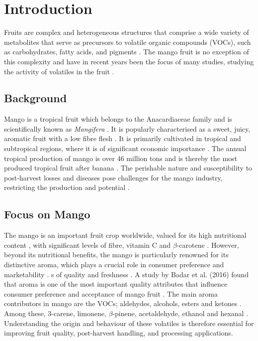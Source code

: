 \setcounter{chapter}{1}
\setcounter{section}{0}
\setlength{\headheight}{12.71342pt}
\addtolength{\topmargin}{-0.71342pt}

\section{Introduction}
Fruits are complex and heterogeneous structures that comprise  a wide variety of metabolites that serve as precursors to volatile organic compounds (VOCs), such as carbohydrates, fatty acids, and pigments \cite*{A03_PanoFarias2017}. The mango fruit is no exception of this complexity and have in recent years been the focus of many studies, studying the activity of volatiles in the fruit \cite*{A04_GUO2023112779}.

\subsection{Background}
Mango is a tropical fruit which belongs to the Anacardiaceae family and is scientifically known as \textit{Mangifera} \cite*{A04_GUO2023112779}. It is popularly characterised as a sweet, juicy, aromatic fruit with a low fibre flesh \cite*{A05_Chin2019}. It is primarily cultivated in tropical and subtropical regions, where it is of significant economic importance \cite*{A05_Chin2019}. 
The annual tropical production of mango is over 46 million tons and is thereby the most produced tropical fruit after banana \cite*{A05_Chin2019, A07_Bonneau2016}. The perishable nature and susceptibility to post-harvest losses and diseases pose challenges for the mango industry, restricting the production and potential \cite*{A05_Chin2019}.

\subsection{Focus on Mango}
The mango is an important fruit crop worldwide, valued for its high nutritional content \cite*{A01_Aguirre-Lopez_2023}, with significant levels of fibre, vitamin C and $\beta$-carotene \cite*{A07_Bonneau2016}. However, beyond its nutritional benefits, the mango is particularly renowned for its distinctive aroma, which plays a crucial role in consumer preference and marketability \cite*{A06_Badar2016}. s of quality and freshness \cite*{A05_Chin2019}.
A study by Badar et al. (2016) found that aroma is one of the most important quality attributes that influence consumer preference and acceptance of mango fruit \cite*{A06_Badar2016}. The main aroma contributors in mango are the VOCs; aldehydes, alcohols, esters and ketones \cite*{A02_Moreno2010}. Among these, 3-carene, limonene, $\beta$-pinene, acetaldehyde, ethanol and hexanal \cite*{A02_Moreno2010}. Understanding the origin and behaviour of these volatiles is therefore essential for improving fruit quality, post-harvest handling, and processing applications.

